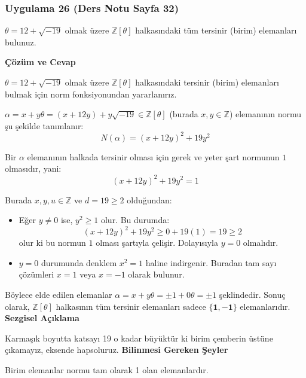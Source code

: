 \documentclass[11pt, a4paper]{article}
\newenvironment{cozum}{
    \vspace{0.5cm}
    \noindent\textcolor{green!60!black}{\faCheckCircle\enspace \textbf{\Large Çözüm ve Cevap}}\par\vspace{0.2cm}
}{}
\newenvironment{sezgisel}{
    \vspace{0.5cm}
    \noindent\textcolor{orange!80!black}{\faLightbulb\enspace \textbf{\Large Sezgisel Açıklama}}\par\vspace{0.2cm}
    \itshape
}{}
\newenvironment{bilgi}{
    \vspace{0.5cm}
    \noindent\textcolor{red!70!black}{\faExclamationTriangle\enspace \textbf{\Large Bilinmesi Gereken Şeyler}}\par\vspace{0.2cm}
}{}
\begin{document}
\subsubsection{Uygulama 26 (Ders Notu Sayfa 32)}
\begin{sorubox}
$\theta = 12 + \sqrt{-19}$ olmak üzere $\mathbb{Z}[\theta]$ halkasındaki tüm tersinir (birim) elemanları bulunuz.
\end{sorubox}
\begin{cozum}
$\theta = 12 + \sqrt{-19}$ olmak üzere $\mathbb{Z}[\theta]$ halkasındaki tersinir (birim) elemanları bulmak için norm fonksiyonundan yararlanırız.

$\alpha = x + y\theta = (x + 12y) + y\sqrt{-19} \in \mathbb{Z}[\theta]$ (burada $x, y \in \mathbb{Z}$) elemanının normu şu şekilde tanımlanır:
\[ N(\alpha) = (x + 12y)^2 + 19 y^2 \]

Bir $\alpha$ elemanının halkada tersinir olması için gerek ve yeter şart normunun $1$ olmasıdır, yani:
\[ (x + 12y)^2 + 19 y^2 = 1 \]

Burada $x, y, u \in \mathbb{Z}$ ve $d = 19 \ge 2$ olduğundan:
\begin{itemize}
    \item Eğer $y \neq 0$ ise, $y^2 \ge 1$ olur. Bu durumda:
    \[ (x + 12y)^2 + 19 y^2 \ge 0 + 19(1) = 19 \ge 2 \]
    olur ki bu normun $1$ olması şartıyla çelişir. Dolayısıyla $y = 0$ olmalıdır.
    \item $y = 0$ durumunda denklem $x^2 = 1$ haline indirgenir. Buradan tam sayı çözümleri $x = 1$ veya $x = -1$ olarak bulunur.
\end{itemize}

Böylece elde edilen elemanlar $\alpha = x + y\theta = \pm 1 + 0\theta = \pm 1$ şeklindedir. Sonuç olarak, $\mathbb{Z}[\theta]$ halkasının tüm tersinir elemanları sadece $\mathbf{\{1, -1\}}$ elemanlarıdır.
\end{cozum}
\begin{sezgisel}
Karmaşık boyutta katsayı 19 o kadar büyüktür ki birim çemberin üstüne çıkamayız, eksende hapsoluruz.
\end{sezgisel}
\begin{bilgi}
Birim elemanlar normu tam olarak 1 olan elemanlardır.
\end{bilgi}

\newpage
\end{document}
